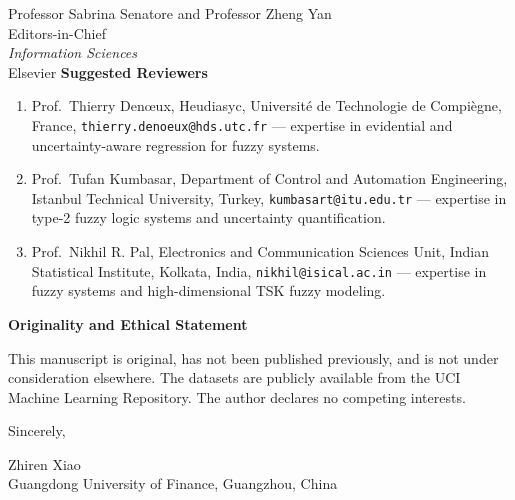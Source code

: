 \documentclass[11pt]{letter}
\begin{document}
\begin{letter}{Professor Sabrina Senatore and Professor Zheng Yan \\ Editors-in-Chief \\ \textit{Information Sciences} \\ Elsevier}
\noindent\textbf{Suggested Reviewers}

\begin{enumerate}
\item Prof.\ Thierry Den\oe ux, Heudiasyc, Universit\'e de Technologie de Compi\`egne, France, \texttt{thierry.denoeux@hds.utc.fr} --- expertise in evidential and uncertainty-aware regression for fuzzy systems.
\item Prof.\ Tufan Kumbasar, Department of Control and Automation Engineering, Istanbul Technical University, Turkey, \texttt{kumbasart@itu.edu.tr} --- expertise in type-2 fuzzy logic systems and uncertainty quantification.
\item Prof.\ Nikhil R. Pal, Electronics and Communication Sciences Unit, Indian Statistical Institute, Kolkata, India, \texttt{nikhil@isical.ac.in} --- expertise in fuzzy systems and high-dimensional TSK fuzzy modeling.
\end{enumerate}

\noindent\textbf{Originality and Ethical Statement}

This manuscript is original, has not been published previously, and is not under consideration elsewhere. The datasets are publicly available from the UCI Machine Learning Repository. The author declares no competing interests.

\closing{Sincerely,}

Zhiren Xiao \\
Guangdong University of Finance, Guangzhou, China

\end{letter}
\end{document}
